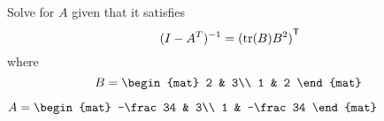 
\begin{Exercise}[
name={},
title={}, 
difficulty=0,
origin={\cite{YL}}]
Solve for $A$ given that it satisfies
\[
(I-A^T)^{-1} = {{(\operatorname{tr}(B)B^2)}^{\mathsf{T}}}
\]
where
\[
B=
\begin{mat}
2 & 3\\
1 & 2
\end{mat}\;
\]

\end{Exercise}

\begin{Answer}
$
A=
\begin{mat}
-\frac34 & 3\\
1 & -\frac34
\end{mat}
$
\end{Answer}
